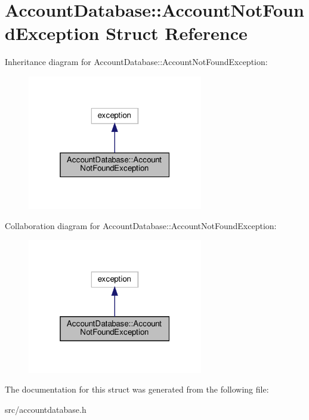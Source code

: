 \hypertarget{structAccountDatabase_1_1AccountNotFoundException}{}\section{Account\+Database\+:\+:Account\+Not\+Found\+Exception Struct Reference}
\label{structAccountDatabase_1_1AccountNotFoundException}


Inheritance diagram for Account\+Database\+:\+:Account\+Not\+Found\+Exception\+:
\nopagebreak
\begin{figure}[H]
\begin{center}
\leavevmode
\includegraphics[width=217pt]{structAccountDatabase_1_1AccountNotFoundException__inherit__graph}
\end{center}
\end{figure}


Collaboration diagram for Account\+Database\+:\+:Account\+Not\+Found\+Exception\+:
\nopagebreak
\begin{figure}[H]
\begin{center}
\leavevmode
\includegraphics[width=217pt]{structAccountDatabase_1_1AccountNotFoundException__coll__graph}
\end{center}
\end{figure}


The documentation for this struct was generated from the following file\+:\begin{DoxyCompactItemize}
\item 
src/accountdatabase.\+h\end{DoxyCompactItemize}

